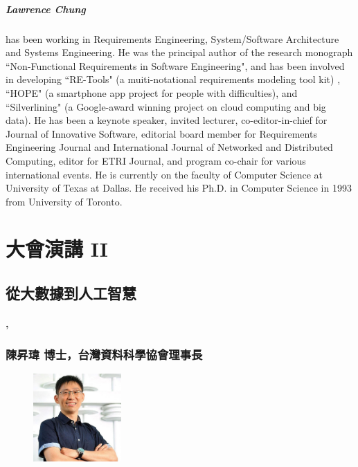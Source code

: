 \documentclass[12pt,oneside,a4paper]{book}
\begin{document}
\paragraph{Lawrence Chung} has been working in Requirements Engineering, System/Software Architecture and Systems Engineering. He was the principal author of the research monograph “Non-Functional Requirements in Software Engineering", and has been involved in developing ``RE-Tools" (a muiti-notational requirements modeling tool kit) , ``HOPE" (a smartphone app project for people with difficulties), and ``Silverlining" (a Google-award winning project on cloud computing and big data).  He has been a keynote speaker, invited lecturer, co-editor-in-chief for Journal of Innovative Software, editorial board member for Requirements Engineering Journal and  International Journal of Networked and Distributed Computing, editor for ETRI Journal, and program co-chair for various international events.  He is currently on the faculty of Computer Science at University of Texas at Dallas.  He received his Ph.D. in Computer Science in 1993 from University of Toronto.

\chapter*{大會演講 II}
%

\section*{從大數據到人工智慧}
\subsubsection*{\TimeKeynoteTwo, \LocationKeynoteTwo}


\subsection*{陳昇瑋 博士，台灣資料科學協會理事長}

\begin{figure}
	\includegraphics[width=0.3\textwidth]{images/chen.jpg}    
\end{figure}
\end{document}

